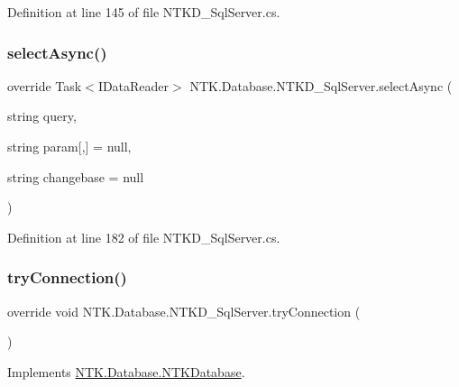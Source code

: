 Definition at line 145 of file N\+T\+K\+D\+\_\+\+Sql\+Server.\+cs.

\mbox{\label{class_n_t_k_1_1_database_1_1_n_t_k_d___sql_server_ad2e51c5ebdce076174762b9fe8142804}} 
\subsubsection{\texorpdfstring{selectAsync()}{selectAsync()}}
{\footnotesize\ttfamily override Task$<$I\+Data\+Reader$>$ N\+T\+K.\+Database.\+N\+T\+K\+D\+\_\+\+Sql\+Server.\+select\+Async (\begin{DoxyParamCaption}\item[{string}]{query,  }\item[{string}]{param\mbox{[},\mbox{]} = {\ttfamily null},  }\item[{string}]{changebase = {\ttfamily null} }\end{DoxyParamCaption})}



Definition at line 182 of file N\+T\+K\+D\+\_\+\+Sql\+Server.\+cs.

\mbox{\label{class_n_t_k_1_1_database_1_1_n_t_k_d___sql_server_a9ea0858ec61e56a805a99c3a6948a122}} 
\subsubsection{\texorpdfstring{tryConnection()}{tryConnection()}}
{\footnotesize\ttfamily override void N\+T\+K.\+Database.\+N\+T\+K\+D\+\_\+\+Sql\+Server.\+try\+Connection (\begin{DoxyParamCaption}{ }\end{DoxyParamCaption})\hspace{0.3cm}{\ttfamily [virtual]}}







Implements \mbox{\hyperlink{class_n_t_k_1_1_database_1_1_n_t_k_database_a8035cdddb04d0e90a712aa8e24abeb43}{N\+T\+K.\+Database.\+N\+T\+K\+Database}}.



